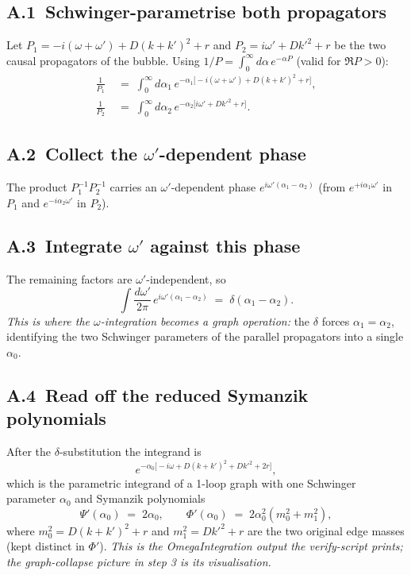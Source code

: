 \documentclass[11pt,a4paper]{article}
\begin{document}
\subsection*{A.1\ Schwinger-parametrise both propagators}

Let $P_{1} = -i(\omega+\omega') + D(k+k')^{2} + r$ and $P_{2} = i\omega' + Dk'^{2} + r$ be
the two causal propagators of the bubble. Using $1/P = \int_{0}^{\infty}\!d\alpha\,
e^{-\alpha P}$ (valid for $\Re P > 0$):
\begin{align*}
\frac{1}{P_{1}} &\;=\; \int_{0}^{\infty}\!\!d\alpha_{1}\,
e^{-\alpha_{1}\bigl[-i(\omega+\omega') + D(k+k')^{2} + r\bigr]}, \\
\frac{1}{P_{2}} &\;=\; \int_{0}^{\infty}\!\!d\alpha_{2}\,
e^{-\alpha_{2}\bigl[i\omega' + Dk'^{2} + r\bigr]}.
\end{align*}

\subsection*{A.2\ Collect the $\omega'$-dependent phase}

The product $P_{1}^{-1}P_{2}^{-1}$ carries an $\omega'$-dependent phase $e^{i\omega'(\alpha_{1}-\alpha_{2})}$
(from $e^{+i\alpha_{1}\omega'}$ in $P_{1}$ and $e^{-i\alpha_{2}\omega'}$ in $P_{2}$).

\subsection*{A.3\ Integrate $\omega'$ against this phase}

The remaining factors are $\omega'$-independent, so
\[
\int\!\frac{d\omega'}{2\pi}\,e^{i\omega'(\alpha_{1}-\alpha_{2})}
\;=\; \delta(\alpha_{1}-\alpha_{2}).
\]
\emph{This is where the $\omega$-integration becomes a graph operation:} the $\delta$
forces $\alpha_{1} = \alpha_{2}$, identifying the two Schwinger parameters of the parallel
propagators into a single $\alpha_{0}$.

\subsection*{A.4\ Read off the reduced Symanzik polynomials}

After the $\delta$-substitution the integrand is
\[
e^{-\alpha_{0}\bigl[-i\omega + D(k+k')^{2} + Dk'^{2} + 2r\bigr]},
\]
which is the parametric integrand of a 1-loop graph with one Schwinger parameter
$\alpha_{0}$ and Symanzik polynomials
\[
\Psi'(\alpha_{0}) \;=\; 2\alpha_{0},
\qquad
\Phi'(\alpha_{0}) \;=\; 2\alpha_{0}^{2}(m_{0}^{2}+m_{1}^{2}),
\]
where $m_{0}^{2} = D(k+k')^{2} + r$ and $m_{1}^{2} = Dk'^{2} + r$ are the two original
edge masses (kept distinct in $\Phi'$). \emph{This is the OmegaIntegration output the
verify-script prints; the graph-collapse picture in step 3 is its visualisation.}
\end{document}
